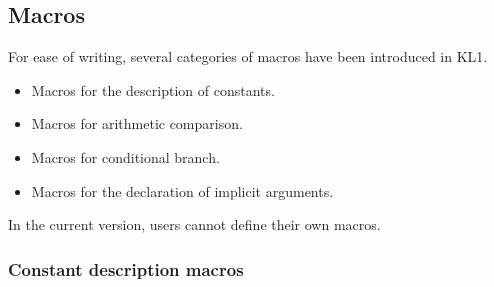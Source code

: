 \subsection{Macros}
\label{sec-macro}

For ease of writing, several categories of macros have been introduced in KL1.
\begin{itemize}
\item Macros for the description of constants.
\item Macros for arithmetic comparison.
\item Macros for conditional branch.
\item Macros for the declaration of implicit arguments.
\end{itemize}
In the current version, users cannot define their own macros.

\subsubsection{Constant description macros}

